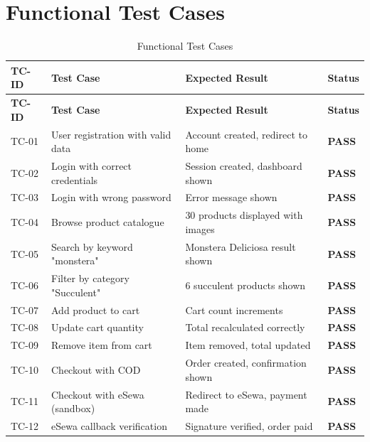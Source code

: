 \documentclass[12pt,a4paper]{report}
\begin{document}
\section{Functional Test Cases}

\begin{longtable}{@{}llll@{}}
\caption{Functional Test Cases} \\
\toprule
\textbf{TC-ID} & \textbf{Test Case} & \textbf{Expected Result} & \textbf{Status} \\
\midrule
\endfirsthead
\toprule
\textbf{TC-ID} & \textbf{Test Case} & \textbf{Expected Result} & \textbf{Status} \\
\midrule
\endhead
TC-01 & User registration with valid data   & Account created, redirect to home & \textcolor{GreenPrimary}{\textbf{PASS}} \\
TC-02 & Login with correct credentials       & Session created, dashboard shown  & \textcolor{GreenPrimary}{\textbf{PASS}} \\
TC-03 & Login with wrong password            & Error message shown               & \textcolor{GreenPrimary}{\textbf{PASS}} \\
TC-04 & Browse product catalogue             & 30 products displayed with images & \textcolor{GreenPrimary}{\textbf{PASS}} \\
TC-05 & Search by keyword "monstera"         & Monstera Deliciosa result shown   & \textcolor{GreenPrimary}{\textbf{PASS}} \\
TC-06 & Filter by category "Succulent"       & 6 succulent products shown        & \textcolor{GreenPrimary}{\textbf{PASS}} \\
TC-07 & Add product to cart                  & Cart count increments             & \textcolor{GreenPrimary}{\textbf{PASS}} \\
TC-08 & Update cart quantity                 & Total recalculated correctly      & \textcolor{GreenPrimary}{\textbf{PASS}} \\
TC-09 & Remove item from cart                & Item removed, total updated       & \textcolor{GreenPrimary}{\textbf{PASS}} \\
TC-10 & Checkout with COD                    & Order created, confirmation shown & \textcolor{GreenPrimary}{\textbf{PASS}} \\
TC-11 & Checkout with eSewa (sandbox)        & Redirect to eSewa, payment made   & \textcolor{GreenPrimary}{\textbf{PASS}} \\
TC-12 & eSewa callback verification          & Signature verified, order paid    & \textcolor{GreenPrimary}{\textbf{PASS}} \\

\end{longtable}
\end{document}
